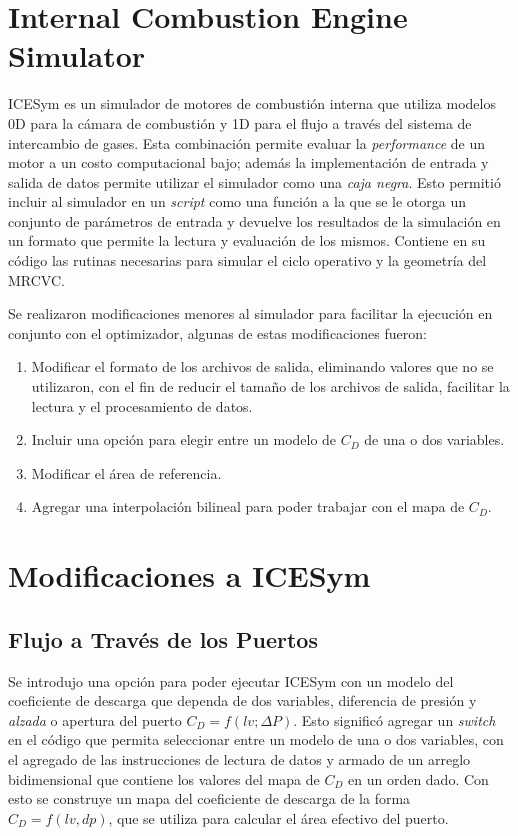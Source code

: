 \section{Internal Combustion Engine Simulator}
%
ICESym es un simulador de motores de combustión interna que  utiliza modelos 0D
para la cámara de combustión y 1D para el flujo a través del sistema de
intercambio de gases.
%
Esta combinación permite evaluar la \emph{performance} de un motor a un costo
computacional bajo; además la implementación de entrada y salida de datos
permite utilizar el simulador como una \emph{caja negra}.
%
Esto permitió incluir al simulador en un \emph{script} como una función a la que
se le otorga un conjunto de parámetros de entrada y devuelve los resultados de
la simulación en un formato que permite la lectura y evaluación de los mismos.
%
Contiene en su código las rutinas necesarias para simular el ciclo operativo y la
geometría del MRCVC.

Se realizaron modificaciones menores al simulador para facilitar la ejecución en
conjunto con el optimizador, algunas de estas modificaciones fueron:
%
\begin{enumerate}
    \item Modificar el formato de los archivos de salida, eliminando valores que
no se utilizaron, con el fin de reducir el tamaño de los archivos de salida,
facilitar la lectura y el procesamiento de datos.
    \item Incluir una opción para elegir entre un modelo de $C_D$ de una o dos
variables.
    \item Modificar el área de referencia.
    \item Agregar una interpolación bilineal para poder trabajar con el mapa de
$C_D$.
\end{enumerate}


\section{Modificaciones a ICESym}
\subsection{Flujo a Través de los Puertos}
%
Se introdujo una opción para poder ejecutar ICESym con un modelo del coeficiente
de descarga que dependa de dos variables, diferencia de presión y \emph{alzada}
o apertura del puerto $C_D = f(lv; \Delta P)$.
%
Esto significó agregar un \emph{switch} en el código que permita seleccionar
entre un modelo de una o dos variables, con el agregado de las instrucciones de
lectura de datos y armado de un arreglo bidimensional que contiene los valores
del mapa de $C_{D}$ en un orden dado.
%
Con esto se construye un mapa del coeficiente de descarga de la forma $C_D =
f(lv, dp)$, que se utiliza para calcular el área efectivo del puerto.


